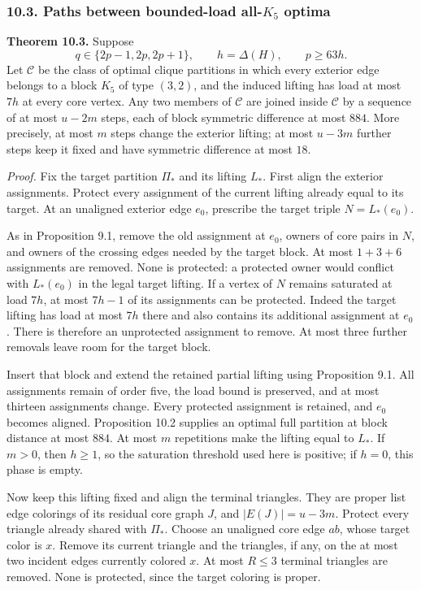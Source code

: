\documentclass[english,11pt,a4paper]{article}
\begin{document}
\subsubsection{\texorpdfstring{10.3. Paths between bounded-load
all-\(K_5\)
optima}{10.3. Paths between bounded-load all-K\_5 optima}}\label{paths-between-bounded-load-all-k_5-optima}

\textbf{Theorem 10.3.} Suppose \[
q\in\{2p-1,2p,2p+1\},\qquad h=\Delta(H),\qquad p\ge63h.
\] Let \(\mathcal C\) be the class of optimal clique partitions in which
every exterior edge belongs to a block \(K_5\) of type \((3,2)\), and
the induced lifting has load at most \(7h\) at every core vertex. Any
two members of \(\mathcal C\) are joined inside \(\mathcal C\) by a
sequence of at most \(u-2m\) steps, each of block symmetric difference
at most \(884\). More precisely, at most \(m\) steps change the exterior
lifting; at most \(u-3m\) further steps keep it fixed and have symmetric
difference at most \(18\).

\emph{Proof.} Fix the target partition \(\Pi_*\) and its lifting
\(L_*\). First align the exterior assignments. Protect every assignment
of the current lifting already equal to its target. At an unaligned
exterior edge \(e_0\), prescribe the target triple \(N=L_*(e_0)\).

As in Proposition 9.1, remove the old assignment at \(e_0\), owners of
core pairs in \(N\), and owners of the crossing edges needed by the
target block. At most \(1+3+6\) assignments are removed. None is
protected: a protected owner would conflict with \(L_*(e_0)\) in the
legal target lifting. If a vertex of \(N\) remains saturated at load
\(7h\), at most \(7h-1\) of its assignments can be protected. Indeed the
target lifting has load at most \(7h\) there and also contains its
additional assignment at \(e_0\). There is therefore an unprotected
assignment to remove. At most three further removals leave room for the
target block.

Insert that block and extend the retained partial lifting using
Proposition 9.1. All assignments remain of order five, the load bound is
preserved, and at most thirteen assignments change. Every protected
assignment is retained, and \(e_0\) becomes aligned. Proposition 10.2
supplies an optimal full partition at block distance at most \(884\). At
most \(m\) repetitions make the lifting equal to \(L_*\). If \(m>0\),
then \(h\ge1\), so the saturation threshold used here is positive; if
\(h=0\), this phase is empty.

Now keep this lifting fixed and align the terminal triangles. They are
proper list edge colorings of its residual core graph \(J\), and
\(|E(J)|=u-3m\). Protect every triangle already shared with \(\Pi_*\).
Choose an unaligned core edge \(ab\), whose target color is \(x\).
Remove its current triangle and the triangles, if any, on the at most
two incident edges currently colored \(x\). At most \(R\le3\) terminal
triangles are removed. None is protected, since the target coloring is
proper.
\end{document}
